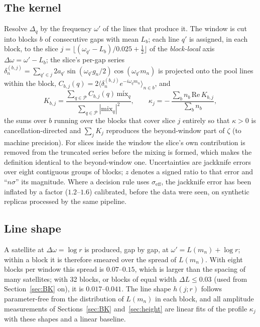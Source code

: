 \documentclass[12pt]{amsart}
\begin{document}
\subsection*{The kernel}
Resolve $\Delta_q$ by the frequency $\omega'$ of the lines that produce
it. The window is cut into blocks $b$ of consecutive gaps with mean
$L_b$; each line $q'$ is assigned, in each block, to the slice
$j = \lfloor(\omega_{q'} - L_b)/0.025 + \tfrac12\rfloor$ of the
\emph{block-local} axis $\Delta\omega = \omega' - L_b$; the slice's
per-gap series $\delta^{(b,j)}_n = \sum_{q'\in j} 2a_{q'}\sin(\omega_{q'}g_n/2)\cos(\omega_{q'}m_n)$
is projected onto the pool lines within the block,
$C_{b,j}(q) = 2\langle \delta^{(b,j)}_n e^{-i\omega_q m_n}\rangle_{n\in b}$, and
\begin{equation}\label{eq:K}
K_{b,j} = \frac{\sum_{q\in\mathcal P} C_{b,j}(q)\,\overline{\mathrm{mix}_q}}
{\sum_{q\in\mathcal P}|\mathrm{mix}_q|^2}, \qquad
\kappa_j = -\,\frac{\sum_{b} n_b\,\mathrm{Re}\,K_{b,j}}{\sum_b n_b},
\end{equation}
the sums over $b$ running over the blocks that cover slice $j$ entirely
so that $\kappa > 0$ is cancellation-directed and
$\sum_j K_j$ reproduces the beyond-window part of $\zeta$ (to machine
precision). For slices inside the window the slice's own contribution is
removed from the truncated series before the mixing is formed, which
makes the definition identical to the beyond-window one. Uncertainties
are jackknife errors over eight contiguous groups of blocks; $z$ denotes a
signed ratio to that error and ``$n\sigma$'' its magnitude. Where a
decision rule uses $\sigma_{\mathrm{eff}}$, the jackknife error has been
inflated by a factor ($1.2$--$1.6$) calibrated, before the data were seen,
on synthetic replicas processed by the same pipeline.

\subsection*{Line shape}
A satellite at $\Delta\omega = \log r$ is produced, gap by gap, at
$\omega' = L(m_n) + \log r$; within a block it is therefore smeared over
the spread of $L(m_n)$. With eight blocks per window this spread is
$0.07$--$0.15$, which is larger than the spacing of many satellites; with
32 blocks, or blocks of equal width $\Delta L \le 0.03$ (used from
Section~\ref{sec:BK} on), it is $0.017$--$0.041$. The line shape
$h(j; r)$ follows parameter-free from the distribution of $L(m_n)$ in each
block, and all amplitude measurements of Sections~\ref{sec:BK}
and~\ref{sec:height} are linear fits of the profile $\kappa_j$ with these
shapes and a linear baseline.
\end{document}
